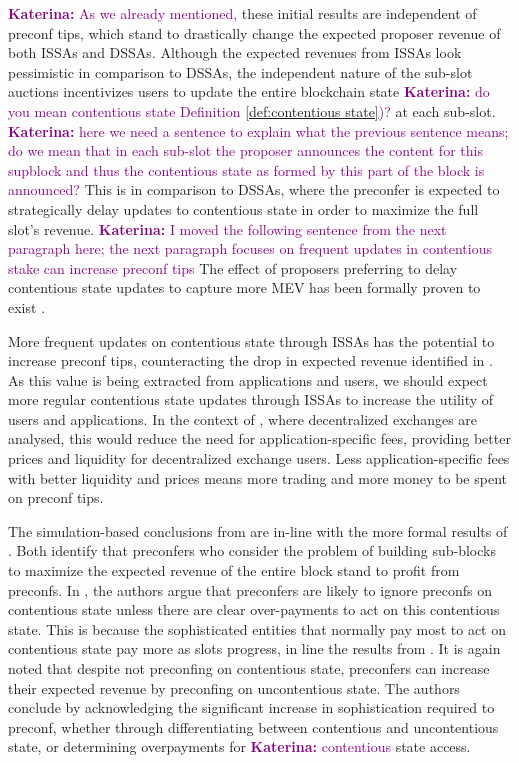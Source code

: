 \documentclass[a4paper]{article}
\theoremstyle{boldstyle}
\newcommand{\ks}[1]{\textcolor{purple}{\textbf{Katerina:} #1}}
\begin{document}
    \ks{As we already mentioned,} these initial results are independent of preconf tips, which stand to drastically change the expected proposer revenue of both ISSAs and DSSAs. Although the expected revenues from ISSAs look pessimistic in comparison to DSSAs, the independent nature of the sub-slot auctions incentivizes users to update the entire blockchain state \ks{do you mean contentious state Definition \ref{def:contentious state})?} at each sub-slot. \ks{here we need a sentence to explain what the previous sentence means; do we mean that in each sub-slot the proposer announces the content for this supblock and thus the contentious state as formed by this part of the block is announced?} This is in comparison to DSSAs, where the preconfer is expected to strategically delay updates to contentious state in order to maximize the full slot's revenue. \ks{ I moved the following sentence from the next paragraph here; the next paragraph focuses on frequent updates in contentious stake can increase preconf tips} The effect of proposers preferring to delay contentious state updates to capture more MEV has been formally proven to exist \cite{LVRwithFees}. 
    
    More frequent updates on contentious state through ISSAs has the potential to increase preconf tips, counteracting the drop in expected revenue identified in \cite{W:EstimatingtheRevenuefromIndependentSub-SlotAuctionPreconfirmations}. %
    As this value is being extracted from applications and users, we should expect more regular contentious state updates through ISSAs to increase the utility of users and applications. In the context of \cite{LVRwithFees}, where decentralized exchanges are analysed, this would reduce the need for application-specific fees, providing better prices and liquidity for decentralized exchange users. Less application-specific fees with better liquidity and prices means more trading and more money to be spent on preconf tips. 
    
    
    The simulation-based conclusions from \cite{W:PreconfirmationsundertheNOlens} are in-line with the more formal results of \cite{W:AnalysingExpectedProposerRevenuefromPreconfirmations}. Both identify that preconfers who consider the problem of building sub-blocks to maximize the expected revenue of the entire block stand to profit from preconfs. In  \cite{W:PreconfirmationsundertheNOlens}, the authors argue that preconfers  are likely to ignore preconfs on contentious state unless there are clear over-payments to act on this contentious state. This is because the sophisticated entities that normally pay most to act on contentious state pay more as slots progress, in line the results from \cite{LVRwithFees}. It is again noted that despite not preconfing on contentious state, preconfers can increase their expected revenue by preconfing on uncontentious state. The authors conclude by acknowledging the significant increase in sophistication required to preconf, whether through differentiating between contentious and uncontentious state, or determining overpayments for \ks{contentious} state access.  
    
\end{document}
